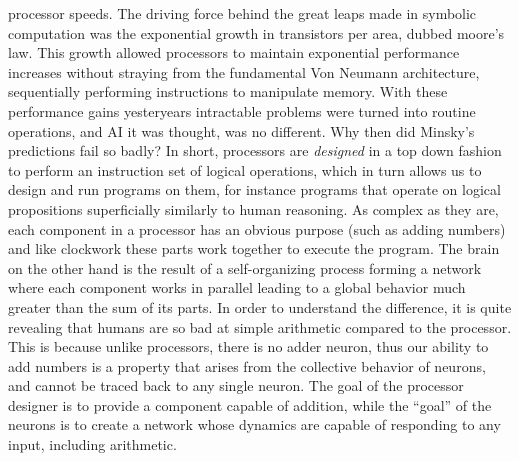 processor speeds.
The driving force behind the great leaps made in symbolic computation was the
exponential growth in transistors per area, dubbed moore's law.
This growth allowed processors to maintain exponential performance increases
without straying from the fundamental Von Neumann architecture, sequentially
performing instructions to manipulate memory.
With these performance gains yesteryears intractable problems were turned into
routine operations, and AI it was thought, was no different. Why then did Minsky's
predictions fail so badly?
In short, processors are \emph{designed} in a top down fashion to perform
an instruction set of logical operations, which in turn allows us to design and run programs on them,
for instance programs that operate on logical propositions superficially
similarly to human reasoning.
As complex as they are, each component in a processor has an obvious purpose
(such as adding numbers) and like clockwork these parts work together to execute
the program.
The brain on the other hand is the result of a self-organizing process forming a
network where each component works in parallel leading to a global behavior much
greater than the sum of its parts.
In order to understand the difference, it is quite revealing that humans are so
bad at simple arithmetic compared to the processor.
This is because unlike processors, there is no adder neuron, thus our ability to
add numbers is a property that arises from the collective behavior of neurons,
and cannot be traced back to any single neuron. The goal of the
processor designer is to provide a component capable of addition, while the
``goal'' of the neurons is to create a network whose dynamics are capable of
responding to any input, including arithmetic.
\\ \\

